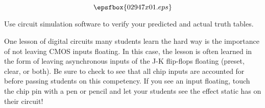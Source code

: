 

$$\epsfbox{02947x01.eps}$$

\vfil \eject






Use circuit simulation software to verify your predicted and actual truth tables.







One lesson of digital circuits many students learn the hard way is the importance of not leaving CMOS inputs floating.  In this case, the lesson is often learned in the form of leaving asynchronous inputs of the J-K flip-flops floating (preset, clear, or both).  Be sure to check to see that all chip inputs are accounted for before passing students on this competency.  If you see an input floating, touch the chip pin with a pen or pencil and let your students see the effect static has on their circuit!




